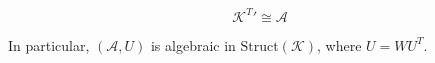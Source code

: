 $$\mathcal{K}^T' \cong \mathcal{A}$$

In particular, $(\mathcal{A}, U)$ is algebraic in $\text{Struct}(\mathcal{K})$, where $U = WU^T$.